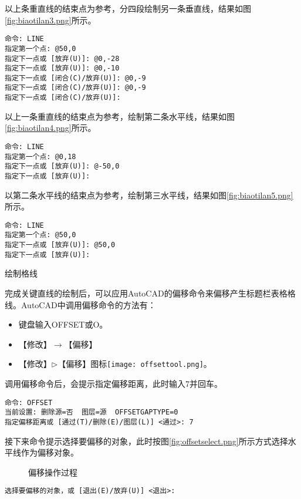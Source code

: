\begin{procedure}
以上条重直线的结束点为参考，分四段绘制另一条垂直线，结果如图\ref{fig:biaotilan3.png}所示。
\begin{lstlisting}
命令: LINE
指定第一个点: @50,0
指定下一点或 [放弃(U)]: @0,-28
指定下一点或 [放弃(U)]: @0,-10
指定下一点或 [闭合(C)/放弃(U)]: @0,-9
指定下一点或 [闭合(C)/放弃(U)]: @0,-9
指定下一点或 [闭合(C)/放弃(U)]:
\end{lstlisting}

以上一条重直线的结束点为参考，绘制第二条水平线，结果如图\ref{fig:biaotilan4.png}所示。
\begin{lstlisting}
命令: LINE
指定第一个点: @0,18
指定下一点或 [放弃(U)]: @-50,0
指定下一点或 [放弃(U)]:
\end{lstlisting}

以第二条水平线的结束点为参考，绘制第三水平线，结果如图\ref{fig:biaotilan5.png}所示。
\begin{lstlisting}
命令: LINE
指定第一个点: @50,0
指定下一点或 [放弃(U)]: @50,0
指定下一点或 [放弃(U)]:
\end{lstlisting}
\item 绘制格线

完成关键直线的绘制后，可以应用AutoCAD的偏移命令来偏移产生标题栏表格格线。AutoCAD中调用偏移命令的方法有：
\begin{itemize}
\item 键盘输入OFFSET或O。
\item 【修改】$\rightarrow$【偏移】
\item 【修改】$\triangleright$【偏移】图标\texttt{[image: offsettool.png]}。
\end{itemize}

调用偏移命令后，会提示指定偏移距离，此时输入7并回车。
\begin{lstlisting}
命令: OFFSET
当前设置: 删除源=否  图层=源  OFFSETGAPTYPE=0
指定偏移距离或 [通过(T)/删除(E)/图层(L)] <通过>: 7
\end{lstlisting}

接下来命令提示选择要偏移的对象，此时按图\ref{fig:offsetselect.png}所示方式选择水平线作为偏移对象。
\begin{figure}[htbp]
\centering
{}\hspace{20pt}
\hspace{20pt}
\caption{偏移操作过程}
\end{figure}
\begin{lstlisting}
选择要偏移的对象，或 [退出(E)/放弃(U)] <退出>:
\end{lstlisting}


\end{procedure}
